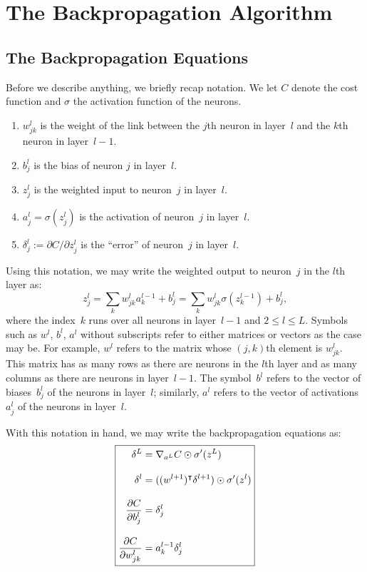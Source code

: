 \chapter{The Backpropagation Algorithm}

\section{The Backpropagation Equations}

Before we describe anything, we briefly recap notation. We let 
$C$ denote the cost function and $\sigma$ the activation function 
of the neurons. 
\begin{enumerate}
    \item $w_{j k}^{l}$ is the weight of the link between the $j$th
        neuron in layer~$l$ and the $k$th neuron in layer~$l - 1$.
    \item $b_j^l$ is the bias of neuron $j$ in layer~$l$.
    \item $z_{j}^l$ is the weighted input to neuron~$j$ in layer~$l$.
    \item $a_j^{l} = \sigma(z_{j}^l)$ is the activation of neuron~$j$ in 
        layer~$l$.
    \item $\delta_{j}^{l} := \partial C / \partial z_{j}^{l}$ is 
        the ``error'' of neuron~$j$ in layer~$l$.
\end{enumerate}

Using this notation, we may write the weighted output to neuron~$j$
in the $l$th layer as:
\[
    z_{j}^{l} = \sum_{k} w_{j k}^l a_{k}^{l - 1} + b_{j}^l = 
                \sum_{k} w_{j k}^l \sigma (z_{k}^{l - 1}) + b_{j}^l, 
\]
where the index~$k$ runs over all neurons in layer~$l - 1$ and 
$2 \leq l \leq L$. Symbols such as $w^{l}$, $b^{l}$, $a^{l}$ without 
subscripts refer to either matrices or vectors as the case may be. 
For example, $w^{l}$ refers to the matrix whose $(j, k)$th element 
is $w_{j k}^{l}$. This matrix has as many rows as there are neurons
in the $l$th layer and as many columns as there are neurons in 
layer~$l - 1$. The symbol~$b^{l}$ refers to the vector of 
biases~$b_{j}^l$ of the neurons in layer~$l$; similarly, $a^{l}$ 
refers to the vector of activations~$a_{j}^l$ of the neurons in 
layer~$l$.

With this notation in hand, we may write the backpropagation equations
as:
\begin{equation}
\boxed{
\setlength{\jot}{12pt}
\begin{aligned}
    \delta^{L} & = \nabla_{a^L} C \odot \sigma'(z^L) \\
    \delta^{l} & = ( \trans{(w^{l + 1})} \delta^{l + 1} ) \odot \sigma'(z^l) \\
    \frac{\partial C}{\partial b_j^{l}} & = \delta_{j}^l \\
    \frac{\partial C}{\partial w_{j k}^l} & = a_{k}^{l - 1} \delta_{j}^l
\end{aligned}
}
\end{equation}

